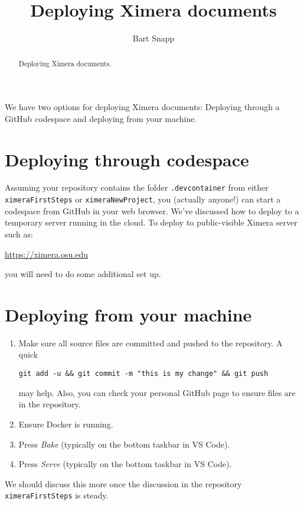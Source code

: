 \documentclass{ximera}
\title{Deploying Ximera documents}
\author{Bart Snapp}
\begin{document}
\begin{abstract}
    Deploying Ximera documents.
\end{abstract}
\maketitle

We have two options for deploying Ximera documents: Deploying through a GitHub
codespace and deploying from your machine.

\section{Deploying through codespace}

Assuming your repository contains the folder \verb!.devcontainer! from either
\verb!ximeraFirstSteps! or \verb!ximeraNewProject!, you (actually anyone!) can
start a codespace from GitHub in your web browser. We've discussed how to
deploy to a temporary  server running in the cloud. To deploy to public-visible
Ximera server such as:
\begin{center}
    \url{https://ximera.osu.edu}
\end{center}
you will need to do some additional set up. 

\section{Deploying from your machine}

\begin{enumerate}
    \item Make sure all source files are committed and pushed to the
          repository. A quick
          \begin{verbatim}
git add -u && git commit -m "this is my change" && git push
\end{verbatim}
          may help. Also, you can check your personal GitHub page to ensure
          files are in
          the repository.
    \item Ensure Docker is running.
    \item Press \textit{Bake} (typically on the bottom taskbar in VS Code).
    \item Press \textit{Serve} (typically on the bottom taskbar in VS Code).
\end{enumerate}

We should discuss this more once the discussion in the repository
\verb!ximeraFirstSteps! is steady.
\end{document}
